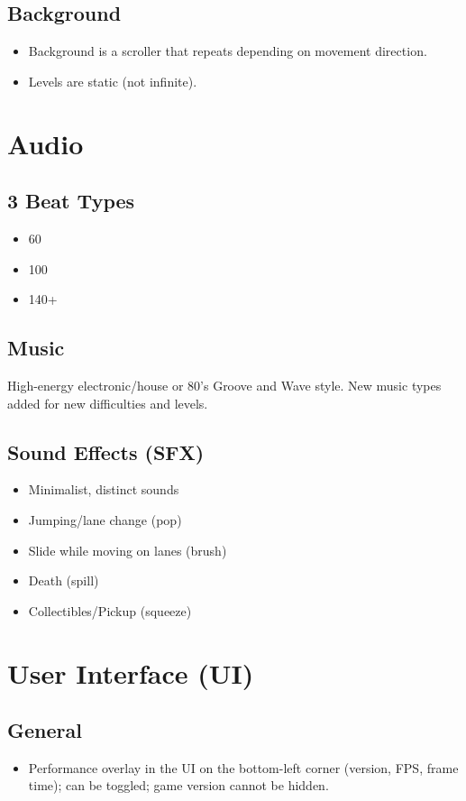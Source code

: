 \documentclass[11pt,a4paper]{report}
\begin{document}
\subsection{Background}
\begin{itemize}
  \item Background is a scroller that repeats depending on movement direction.
  \item Levels are static (not infinite).
\end{itemize}

\section{Audio}
\subsection{3 Beat Types}
\begin{itemize}
  \item 60
  \item 100
  \item 140+
\end{itemize}

\subsection{Music}
High-energy electronic/house or 80's Groove and Wave style. New music types added for new difficulties and levels.

\subsection{Sound Effects (SFX)}
\begin{itemize}
  \item Minimalist, distinct sounds
  \item Jumping/lane change (pop) 
  \item Slide while moving on lanes (brush)
  \item Death (spill)
  \item Collectibles/Pickup (squeeze)
\end{itemize}

\section{User Interface (UI)}
\subsection{General}
\begin{itemize}
  \item Performance overlay in the UI on the bottom-left corner (version, FPS, frame time); can be toggled; game version cannot be hidden.
\end{itemize}
\end{document}
